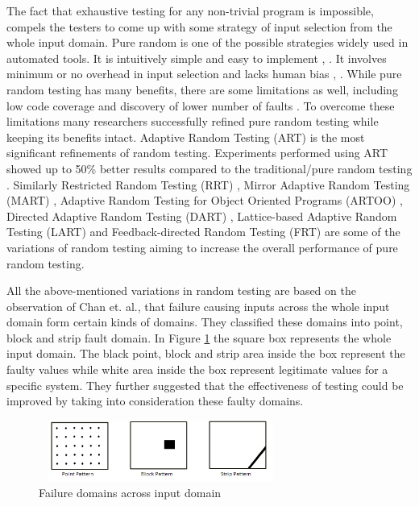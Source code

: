 \documentclass[runningheads,a4paper]{llncs}
\begin{document}
The fact that exhaustive testing for any non-trivial program is impossible, compels the testers to come up with some strategy of input selection from the whole input domain. Pure random is one of the possible strategies widely used in automated tools. It is intuitively simple and easy to implement \cite{Ciupa2008},  \cite{Forrester2000}. It involves minimum or no overhead in input selection and lacks human bias \cite{Hamlet1994},  \cite{Linger1993}. While pure random testing has many benefits, there are some limitations as well, including low code coverage \cite{Offutt1996} and discovery of lower number of faults \cite{Chen1994}. To overcome these limitations many researchers successfully refined pure random testing while keeping its benefits intact. Adaptive Random Testing (ART) is the most significant refinements of random testing. Experiments performed using ART showed up to 50\% better results compared to the traditional/pure random testing  \cite{Chen2008}.  Similarly Restricted Random Testing (RRT) \cite{Chan2002}, Mirror Adaptive Random Testing (MART)  \cite{Chen2004}, Adaptive Random Testing for Object Oriented Programs (ARTOO) \cite{Ciupa2008}, Directed Adaptive Random Testing (DART)  \cite{Godefroid2005}, Lattice-based Adaptive Random Testing (LART) \cite{Mayer2005} and Feedback-directed Random Testing (FRT) \cite{Pacheco2007} are some of the variations of random testing aiming to increase the overall performance of pure random testing.

All the above-mentioned variations in random testing are based on the observation of Chan et. al.,  \cite{Chan1996} that failure causing inputs across the whole input domain form certain kinds of domains. They classified these domains into point, block and strip fault domain. In Figure \ref{fig:patterns} the square box represents the whole input domain. The black point, block and strip area inside the box represent the faulty values while white area inside the box represent legitimate values for a specific system. They further suggested that the effectiveness of testing could be improved by taking into consideration these faulty domains.

\begin{figure}[h]
 \centering
\includegraphics[width=8cm,height=2cm]{ART_Patterns.png}
\caption{Failure domains across input domain \cite{Chan1996}}
\label{fig:patterns}
\end{figure}
\end{document}
